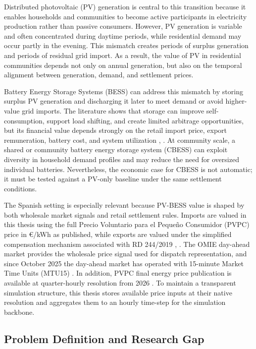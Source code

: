 Distributed photovoltaic (PV) generation is central to this transition
because it enables households and communities to become active
participants in electricity production rather than passive consumers.
However, PV generation is variable and often concentrated during daytime
periods, while residential demand may occur partly in the evening. This
mismatch creates periods of surplus generation and periods of residual
grid import. As a result, the value of PV in residential communities
depends not only on annual generation, but also on the temporal
alignment between generation, demand, and settlement prices.

Battery Energy Storage Systems (BESS) can address this mismatch by
storing surplus PV generation and discharging it later to meet demand or
avoid higher-value grid imports. The literature shows that storage can
improve self-consumption, support load shifting, and create limited
arbitrage opportunities, but its financial value depends strongly on the
retail import price, export remuneration, battery cost, and system
utilization \cite{ch1ref003}, \cite{ch1ref004}. At community scale, a shared or community
battery energy storage system (CBESS) can exploit diversity in household
demand profiles and may reduce the need for oversized individual
batteries. Nevertheless, the economic case for CBESS is not automatic;
it must be tested against a PV-only baseline under the same settlement
conditions.

The Spanish setting is especially relevant because PV-BESS value is
shaped by both wholesale market signals and retail settlement rules.
Imports are valued in this thesis using the full Precio Voluntario para
el Pequeño Consumidor (PVPC) price in €/kWh as published, while exports
are valued under the simplified compensation mechanism associated with
RD 244/2019 \cite{ch1ref002}, \cite{ch1ref005}. The OMIE day-ahead market provides the
wholesale price signal used for dispatch representation, and since
October 2025 the day-ahead market has operated with 15-minute Market
Time Units (MTU15) \cite{ch1ref006}. In addition, PVPC final energy price
publication is available at quarter-hourly resolution from 2026 \cite{ch1ref007}.
To maintain a transparent simulation structure, this thesis stores
available price inputs at their native resolution and aggregates them to
an hourly time-step for the simulation backbone.

\subsection{Problem Definition and Research
Gap}\label{problem-definition-and-research-gap}


